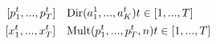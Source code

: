 $$
\begin{align*}
[p_1^t,...,p_T^t] &\text{ ~ Dir}(a_1^1, ..., a_K^t) \space\space\space\space t \in [1, ..., T] \\
[x_1^t,...,x_T^t] &\text{ ~ Mult}(p_1^t,...,p_T^t, n) \space\space\space\space t \in [1, ..., T] \\
\end{align*}
$$